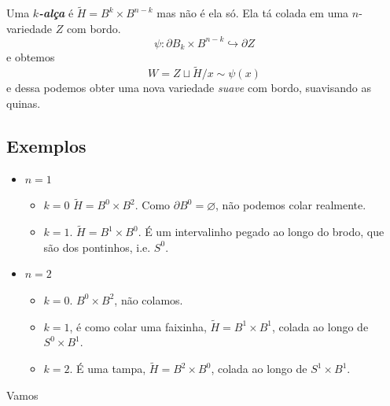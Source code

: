 Uma \textit{\textbf{\(k\)-alça}} é \(\tilde{H}=B^k \times B^{n-k}\) mas não é ela só. Ela tá colada em uma \(n\)-variedade \(Z\) com bordo.
\[\psi: \partial B_k \times B^{n-k} \hookrightarrow  \partial Z\]
e obtemos
 \[W=Z \sqcup \tilde{H}\Big/ x \sim \psi(x)\]
e dessa podemos obter uma nova variedade \textit{suave}  com bordo, suavisando as quinas.

\subsection{Exemplos}
\begin{itemize}
\item \(n=1\) 
	\begin{itemize}
	\item \(k=0\)  \(\tilde{H}= B^0 \times B^2\). Como \(\partial B^0=\varnothing\), não podemos colar realmente.
	\item \(k=1\). \(\tilde{H}=B^1 \times B^0\). É um intervalinho pegado ao longo do brodo, que são dos pontinhos, i.e. \(S^0\).
	\end{itemize}
\item \(n=2\)
	\begin{itemize}
	\item \(k=0\).  \(B^0 \times B^2\), não colamos.
	\item \(k=1\),  é como colar uma faixinha, \(\tilde{H}=B^1 \times B^1\), colada ao longo de \(S^0 \times B^1\).
	\item \(k=2\).  É uma tampa, \(\tilde{H}=B^2 \times B^0\), colada ao longo de  \(S^1 \times B^1\).
	\end{itemize}
\end{itemize}

Vamos 







